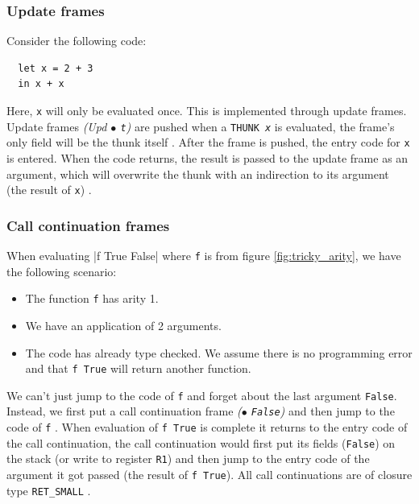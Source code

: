 \subsubsection{Update frames}

Consider the following code:

\begin{verbatim}
  let x = 2 + 3
  in x + x
\end{verbatim}

Here, \texttt{x} will only be evaluated once. This is implemented
through update frames. Update frames \emph{(Upd $\bullet$ \texttt{t})}
are pushed when a \texttt{THUNK \emph{x}} is evaluated, the frame's only
field will be the thunk itself \cite{github_thunk_code}. After the frame is
pushed, the entry code for \texttt{x} is entered. When the code returns,
the result is passed to the update frame as an argument, which will
overwrite the thunk with an indirection to its argument (the result of
\texttt{x}) \cite{github_updates_indirection}.


\subsubsection{Call continuation frames}

When evaluating |f True False|
where \texttt{f} is from figure \ref{fig:tricky_arity}, we have the
following scenario:

\begin{itemize}
  \item
    The function \texttt{f} has arity 1.
  \item
    We have an application of 2 arguments.
  \item
    The code has already type checked. We assume there is no
programming error and that \texttt{f True} will return another function.
\end{itemize}

We can't just jump to the code of \texttt{f} and forget about the last
argument \texttt{False}. Instead, we first put a call continuation
frame \emph{($\bullet$ \texttt{False})} and then jump to the code of \texttt{f}
\cite{evalapplyjfp06}.
When evaluation of \texttt{f True} is complete it returns to
the entry code of the call continuation, the call continuation would
first put its fields (\texttt{False}) on the stack (or write to
register \texttt{R1}) and then jump to the entry code of the argument it
got passed (the result of \texttt{f True}).
All call continuations are of closure type \texttt{RET\_SMALL}
\cite{github_genapply_RET_SMALL}.

